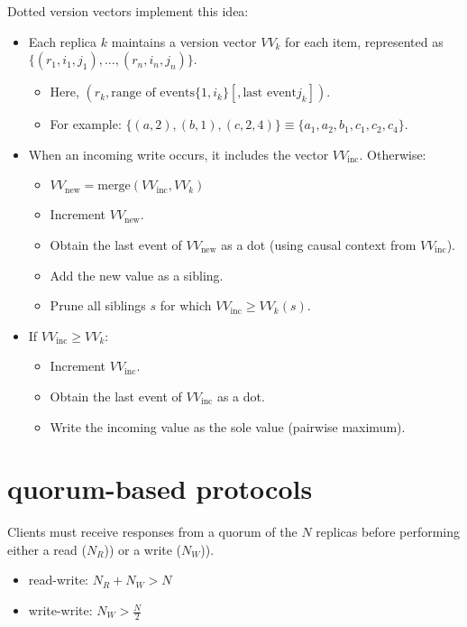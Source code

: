 Dotted version vectors implement this idea:
    \begin{itemize}
        \item Each replica \( k \) maintains a version vector \( VV_k \) for each item, represented as \( \{(r_1, i_1, j_1), \ldots, (r_n, i_n, j_n)\} \).
        \begin{itemize}
            \item Here, \( (r_k, \text{range of events} \{1, i_k\} [, \text{last event} j_k]) \).
            \item For example: \( \{(a, 2), (b, 1), (c, 2, 4)\} \equiv \{a_1, a_2, b_1, c_1, c_2, c_4\} \).
        \end{itemize}
        \item When an incoming write occurs, it includes the vector \( VV_{\text{inc}} \). Otherwise:
        \begin{itemize}
            \item \( VV_{\text{new}} = \text{merge}(VV_{\text{inc}}, VV_k) \)
            \item Increment \( VV_{\text{new}} \).
            \item Obtain the last event of \( VV_{\text{new}} \) as a dot (using causal context from \( VV_{\text{inc}} \)).
            \item Add the new value as a sibling.
            \item Prune all siblings \( s \) for which \( VV_{\text{inc}} \geq VV_k(s) \).
        \end{itemize}
        \item If \( VV_{\text{inc}} \geq VV_k \):
        \begin{itemize}
            \item Increment \( VV_{\text{inc}} \).
            \item Obtain the last event of \( VV_{\text{inc}} \) as a dot.
            \item Write the incoming value as the sole value (pairwise maximum).
        \end{itemize}
    \end{itemize}

\section{quorum-based protocols}

 Clients must receive responses from a quorum of the \( N \) replicas before performing either a read ($N_{R}$)) or a write ($N_{W}$)).
    \begin{itemize}
    \item read-write:
    \(
    N_R + N_W > N
    \)
    
    \item write-write:
    \(
    N_W > \frac{N}{2}
    \)
\end{itemize}

